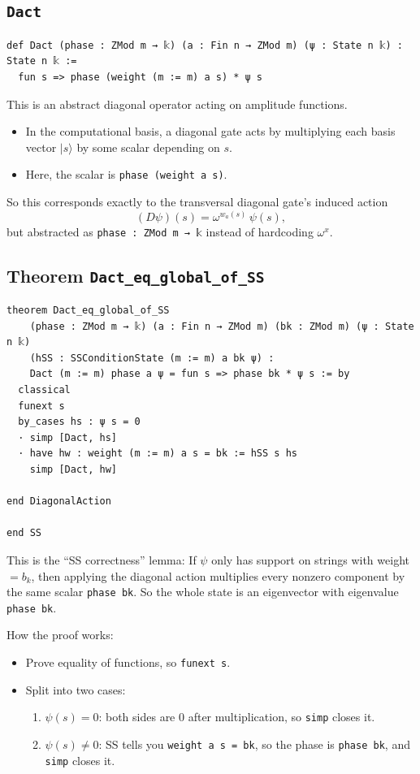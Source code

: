\documentclass[11pt]{article}
\newcommand{\ket}[1]{\lvert #1 \rangle}
\begin{document}
\subsection*{\texttt{Dact}}

\begin{lstlisting}
def Dact (phase : ZMod m → 𝕜) (a : Fin n → ZMod m) (ψ : State n 𝕜) : State n 𝕜 :=
  fun s => phase (weight (m := m) a s) * ψ s
\end{lstlisting}

This is an abstract diagonal operator acting on amplitude functions.

\begin{itemize}
\item In the computational basis, a diagonal gate acts by multiplying each basis vector $\ket{s}$ by some scalar depending on $s$.
\item Here, the scalar is \texttt{phase (weight a s)}.
\end{itemize}

So this corresponds exactly to the transversal diagonal gate’s induced action
\[
(D\psi)(s)=\omega^{w_a(s)}\,\psi(s),
\]
but abstracted as \texttt{phase : ZMod m → 𝕜} instead of hardcoding $\omega^x$.

\subsection*{Theorem \texttt{Dact\_eq\_global\_of\_SS}}

\begin{lstlisting}
theorem Dact_eq_global_of_SS
    (phase : ZMod m → 𝕜) (a : Fin n → ZMod m) (bk : ZMod m) (ψ : State n 𝕜)
    (hSS : SSConditionState (m := m) a bk ψ) :
    Dact (m := m) phase a ψ = fun s => phase bk * ψ s := by
  classical
  funext s
  by_cases hs : ψ s = 0
  · simp [Dact, hs]
  · have hw : weight (m := m) a s = bk := hSS s hs
    simp [Dact, hw]

end DiagonalAction

end SS
\end{lstlisting}

This is the “SS correctness” lemma:
If $\psi$ only has support on strings with weight $=b_k$, then applying the diagonal action multiplies every nonzero component by the same scalar \texttt{phase bk}.
So the whole state is an eigenvector with eigenvalue \texttt{phase bk}.

How the proof works:
\begin{itemize}
\item Prove equality of functions, so \texttt{funext s}.
\item Split into two cases:
\begin{enumerate}
\item $\psi(s)=0$: both sides are $0$ after multiplication, so \texttt{simp} closes it.
\item $\psi(s)\neq 0$: SS tells you \texttt{weight a s = bk}, so the phase is \texttt{phase bk}, and \texttt{simp} closes it.
\end{enumerate}
\end{itemize}
\end{document}
